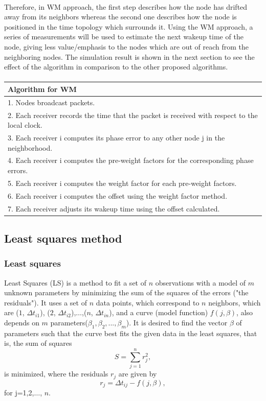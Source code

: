 \documentclass[a4paper,10pt]{report}
\begin{document}
\paragraph*{}
Therefore, in WM approach, the first step describes how the node has
drifted away from its neighbors whereas the second one describes how
the node is positioned in the time topology which surrounds it.
Using the WM approach, a series of measurements will be used to
estimate the next wakeup time of the node, giving less
value/emphasis to the nodes which are out of reach from the
neighboring nodes. The simulation result is shown in the next
section to see the effect of the algorithm in comparison to the
other proposed algorithms.\paragraph*{}
\begin{tabular}{  l }Algorithm for WM \\\hline \hline
1. Nodes broadcast packets. \\  2. Each receiver records the time that the packet is received with respect to the local clock. \\
3. Each receiver i computes its phase error to any other node j in the neighborhood. \\
4. Each receiver i computes the pre-weight factors for the corresponding phase errors. \\
5. Each receiver i computes the weight factor for each pre-weight factors. \\
6. Each receiver i computes the offset using the weight factor method. \\
7. Each receiver adjusts its wakeup time using the offset calculated.\\
\hline \hline
\end{tabular}
\subsection{\textbf{Least squares method}}
\subsubsection{Least squares}
Least Squares (LS) is a method to fit a set of $n$ observations with
a model of $m$ unknown parameters by minimizing the sum of the
squares of the errors ("the residuals"). It uses a set of $n$ data
points, which correspond to $n$ neighbors, which are ($1$, $\Delta t_{i1}$), ($2$, $\Delta t_{i2}$),$\dots$,($n$,
$\Delta t_{in}$), and a curve (model function) $f(j, \beta)$,  also depends on $m$
parameters($\beta_1,\beta_2,...,\beta_m$). It is desired to find the
vector $\beta$ of parameters such that the curve best fits the given
data in the least squares, that is, the sum of squares
\begin{equation}
    S=\sum_{j=1}^{n}r_j^2 ,
\end{equation}
is minimized, where the residuals $r_j$ are given by
\begin{equation}
    r_j = \Delta t_{ij} - f(j,\beta),
\end{equation}
for j=1,2,$\dots$, $n$.
\end{document}
